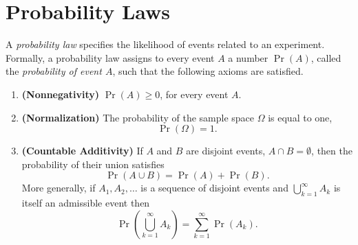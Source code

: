 \section{Probability Laws}
\label{section:ProbabilityLaws}

A \emph{probability law} specifies the likelihood of events related to an experiment.
Formally, a probability law assigns to every event $A$ a number $\Pr (A)$, called the \emph{probability of event $A$}, such that the following axioms are satisfied.
\begin{enumerate}
\item \textbf{(Nonnegativity)} $\Pr (A) \geq 0$, for every event $A$.
\item \textbf{(Normalization)} The probability of the sample space $\Omega$ is equal to one,
\begin{equation*}
\Pr (\Omega) = 1 .
\end{equation*}
\item \textbf{(Countable Additivity)} If $A$ and $B$ are disjoint events, $A \cap B = \emptyset$, then the probability of their union satisfies
\begin{equation*}
\Pr (A \cup B) = \Pr (A) + \Pr (B) .
\end{equation*}
More generally, if $A_1, A_2, \ldots$ is a sequence of disjoint events and $\bigcup_{k=1}^{\infty} A_k$ is itself an admissible event then
\begin{equation*}
\Pr \left( \bigcup_{k=1}^{\infty} A_k \right)
= \sum_{k = 1}^{\infty} \Pr (A_k) .
\end{equation*}
\end{enumerate}

